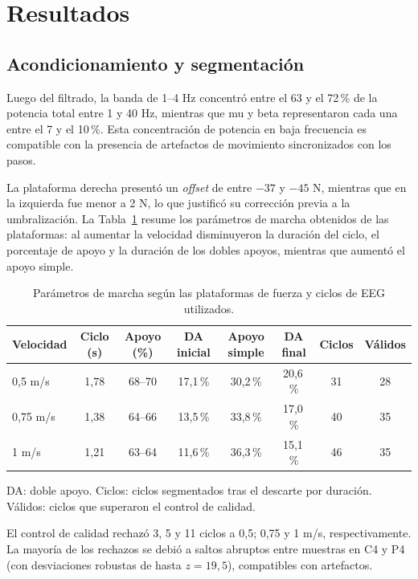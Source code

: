 \documentclass[10pt]{article}
\begin{document}
\section{Resultados}

\subsection{Acondicionamiento y segmentación}

Luego del filtrado, la banda de 1--4 Hz concentró entre el 63 y el 72\,\% de la potencia total entre 1 y 40 Hz, mientras que mu y beta representaron cada una entre el 7 y el 10\,\%. Esta concentración de potencia en baja frecuencia es compatible con la presencia de artefactos de movimiento sincronizados con los pasos.

La plataforma derecha presentó un \textit{offset} de entre $-37$ y $-45$ N, mientras que en la izquierda fue menor a 2 N, lo que justificó su corrección previa a la umbralización. La Tabla~\ref{tab:marcha} resume los parámetros de marcha obtenidos de las plataformas: al aumentar la velocidad disminuyeron la duración del ciclo, el porcentaje de apoyo y la duración de los dobles apoyos, mientras que aumentó el apoyo simple.

\begin{table}[H]
\centering
\small
\begin{tabular}{lccccccc}
\toprule
Velocidad & Ciclo (s) & Apoyo (\%) & DA inicial & Apoyo simple & DA final & Ciclos & Válidos \\
\midrule
0,5 m/s  & 1,78 & 68--70 & 17,1\,\% & 30,2\,\% & 20,6\,\% & 31 & 28 \\
0,75 m/s & 1,38 & 64--66 & 13,5\,\% & 33,8\,\% & 17,0\,\% & 40 & 35 \\
1 m/s    & 1,21 & 63--64 & 11,6\,\% & 36,3\,\% & 15,1\,\% & 46 & 35 \\
\bottomrule
\end{tabular}

\vspace{1mm}
{\footnotesize DA: doble apoyo. Ciclos: ciclos segmentados tras el descarte por duración. Válidos: ciclos que superaron el control de calidad.}
\caption{Parámetros de marcha según las plataformas de fuerza y ciclos de EEG utilizados.}
\label{tab:marcha}
\end{table}

El control de calidad rechazó 3, 5 y 11 ciclos a 0,5; 0,75 y 1 m/s, respectivamente. La mayoría de los rechazos se debió a saltos abruptos entre muestras en C4 y P4 (con desviaciones robustas de hasta $z=19{,}5$), compatibles con artefactos.
\end{document}
